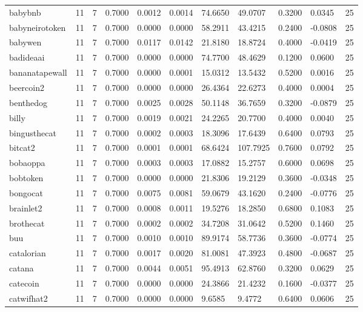 \begin{table}[htbp]
\begin{tabular}{lllllllllll}
babybnb & 11 & 7 & 0.7000 & 0.0012 & 0.0014 & 74.6650 & 49.0707 & 0.3200 & 0.0345 & 25 \\
babyneirotoken & 11 & 7 & 0.7000 & 0.0000 & 0.0000 & 58.2911 & 43.4215 & 0.2400 & -0.0808 & 25 \\
babywen & 11 & 7 & 0.7000 & 0.0117 & 0.0142 & 21.8180 & 18.8724 & 0.4000 & -0.0419 & 25 \\
badideaai & 11 & 7 & 0.7000 & 0.0000 & 0.0000 & 74.7700 & 48.4629 & 0.1200 & 0.0600 & 25 \\
bananatapewall & 11 & 7 & 0.7000 & 0.0000 & 0.0001 & 15.0312 & 13.5432 & 0.5200 & 0.0016 & 25 \\
beercoin2 & 11 & 7 & 0.7000 & 0.0000 & 0.0000 & 26.4364 & 22.6273 & 0.4000 & 0.0004 & 25 \\
benthedog & 11 & 7 & 0.7000 & 0.0025 & 0.0028 & 50.1148 & 36.7659 & 0.3200 & -0.0879 & 25 \\
billy & 11 & 7 & 0.7000 & 0.0019 & 0.0021 & 24.2265 & 20.7700 & 0.4000 & 0.0040 & 25 \\
bingusthecat & 11 & 7 & 0.7000 & 0.0002 & 0.0003 & 18.3096 & 17.6439 & 0.6400 & 0.0793 & 25 \\
bitcat2 & 11 & 7 & 0.7000 & 0.0001 & 0.0001 & 68.6424 & 107.7925 & 0.7600 & 0.0792 & 25 \\
bobaoppa & 11 & 7 & 0.7000 & 0.0003 & 0.0003 & 17.0882 & 15.2757 & 0.6000 & 0.0698 & 25 \\
bobtoken & 11 & 7 & 0.7000 & 0.0000 & 0.0000 & 21.8306 & 19.2129 & 0.3600 & -0.0348 & 25 \\
bongocat & 11 & 7 & 0.7000 & 0.0075 & 0.0081 & 59.0679 & 43.1620 & 0.2400 & -0.0776 & 25 \\
brainlet2 & 11 & 7 & 0.7000 & 0.0008 & 0.0011 & 19.5276 & 18.2850 & 0.6800 & 0.1083 & 25 \\
brothecat & 11 & 7 & 0.7000 & 0.0002 & 0.0002 & 34.7208 & 31.0642 & 0.5200 & 0.1460 & 25 \\
buu & 11 & 7 & 0.7000 & 0.0010 & 0.0010 & 89.9174 & 58.7736 & 0.3600 & -0.0774 & 25 \\
catalorian & 11 & 7 & 0.7000 & 0.0017 & 0.0020 & 81.0081 & 47.3923 & 0.4800 & -0.0687 & 25 \\
catana & 11 & 7 & 0.7000 & 0.0044 & 0.0051 & 95.4913 & 62.8760 & 0.3200 & 0.0629 & 25 \\
catecoin & 11 & 7 & 0.7000 & 0.0000 & 0.0000 & 24.3866 & 21.4232 & 0.1600 & -0.0377 & 25 \\
catwifhat2 & 11 & 7 & 0.7000 & 0.0000 & 0.0000 & 9.6585 & 9.4772 & 0.6400 & 0.0606 & 25 \\

\end{tabular}
\end{table}
